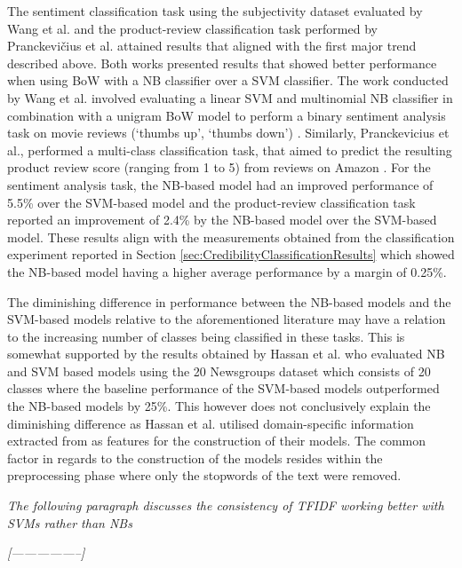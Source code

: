 \documentclass[a4paper,twoside,phd]{BYUPhys}
\begin{document}
The sentiment classification task using the subjectivity dataset \cite{Pang2004} evaluated by Wang et al. \cite{Wang2012} and the product-review classification task performed by Pranckevičius et al. \cite{PRANCKEVICIUS2017} attained results that aligned with the first major trend described above. Both works presented results that showed better performance when using BoW with a NB classifier over a SVM classifier. The work conducted by Wang et al. involved evaluating a linear SVM and multinomial NB classifier in combination with a unigram BoW model to perform a binary sentiment analysis task on movie reviews (`thumbs up', `thumbs down') \cite{Pang2004}. Similarly, Pranckevicius et al., performed a multi-class classification task, that aimed to predict the resulting product review score (ranging from 1 to 5) from reviews on Amazon \cite{PRANCKEVICIUS2017}. For the sentiment analysis task, the NB-based model had an improved performance of 5.5\% over the SVM-based model and the product-review classification task reported an improvement of 2.4\% by the NB-based model over the SVM-based model. These results align with the measurements obtained from the classification experiment reported in Section \ref{sec:CredibilityClassificationResults} which showed the NB-based model having a higher average performance by a margin of 0.25\%. \newline

The diminishing difference in performance between the NB-based models and the SVM-based models relative to the aforementioned literature may have a relation to the increasing number of classes being classified in these tasks. This is somewhat supported by the results obtained by Hassan et al. \cite{Hassan} who evaluated NB and SVM based models using the 20 Newsgroups dataset \cite{Mitchell} which consists of 20 classes where the baseline performance of the SVM-based models outperformed the NB-based models by 25\%. This however does not conclusively explain the diminishing difference as Hassan et al. utilised domain-specific information extracted from as features for the construction of their models. The common factor in regards to the construction of the models resides within the preprocessing phase where only the stopwords of the text were removed. \newline


\textit{The following paragraph discusses the consistency of TFIDF working better with SVMs rather than NBs}

\textit{[-----------------]}
\end{document}
